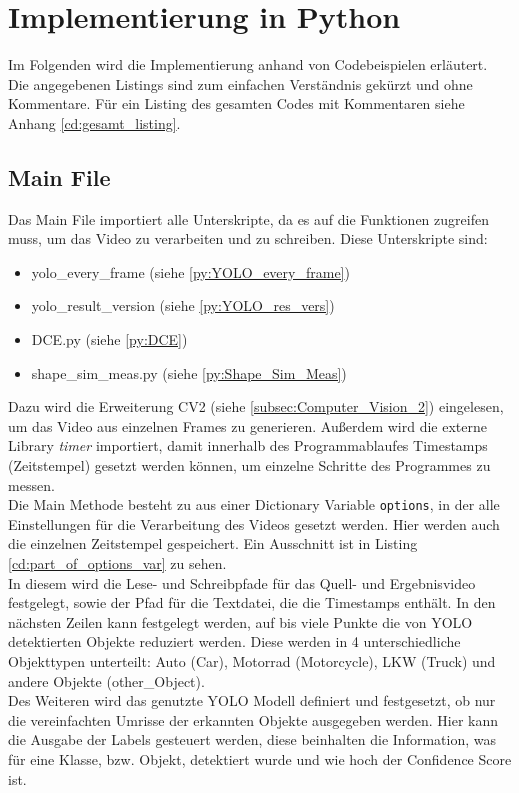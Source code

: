 \section{Implementierung in Python}{\label{implementation_in_python}}
	Im Folgenden wird die Implementierung anhand von Codebeispielen erläutert. Die angegebenen Listings sind zum einfachen Verständnis gekürzt und ohne Kommentare. Für ein Listing des gesamten Codes mit Kommentaren siehe Anhang \ref{cd:gesamt_listing}.
\subsection{Main File}
{
	Das Main File importiert alle Unterskripte, da es auf die Funktionen zugreifen muss, um das Video zu verarbeiten und zu schreiben. Diese Unterskripte sind: 
	\begin{itemize}
		\item yolo\_every\_frame (siehe \ref{py:YOLO_every_frame})
		\item yolo\_result\_version (siehe \ref{py:YOLO_res_vers})
		\item DCE.py (siehe \ref{py:DCE})
		\item shape\_sim\_meas.py (siehe \ref{py:Shape_Sim_Meas})
	\end{itemize}
	Dazu wird die Erweiterung CV2 (siehe \ref{subsec:Computer_Vision_2}) eingelesen, um das Video aus einzelnen Frames zu generieren.
	Außerdem wird die externe Library \textit{timer} importiert, damit innerhalb des Programmablaufes Timestamps (Zeitstempel) gesetzt werden können, um einzelne Schritte des Programmes zu messen.  \\
	Die Main Methode besteht zu aus einer Dictionary Variable \lstinline|options|, in der alle Einstellungen für die Verarbeitung des Videos gesetzt werden. Hier werden auch die einzelnen Zeitstempel gespeichert. Ein Ausschnitt ist in Listing \ref{cd:part_of_options_var} zu sehen. \\
	In diesem wird die Lese- und Schreibpfade für das Quell- und Ergebnisvideo festgelegt, sowie der Pfad für die Textdatei, die die Timestamps enthält. In den nächsten Zeilen kann festgelegt werden, auf bis viele Punkte die von YOLO detektierten Objekte reduziert werden. Diese werden in 4 unterschiedliche Objekttypen unterteilt: Auto (Car), Motorrad (Motorcycle), LKW (Truck) und andere Objekte (other\_Object). \\
	Des Weiteren wird das genutzte YOLO Modell definiert und festgesetzt, ob nur die vereinfachten Umrisse der erkannten Objekte ausgegeben werden. Hier kann die Ausgabe der Labels gesteuert werden, diese beinhalten die Information, was für eine Klasse, bzw. Objekt, detektiert wurde und wie hoch der Confidence Score ist. \\
}
